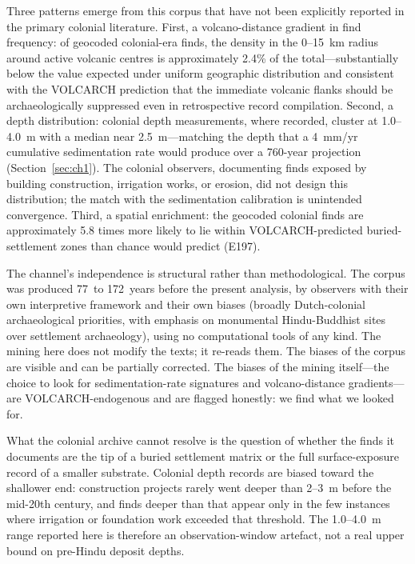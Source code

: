 \documentclass[12pt,a4paper]{article}
\begin{document}
Three patterns emerge from this corpus that have not been explicitly reported in the primary colonial literature. First, a volcano-distance gradient in find frequency: of geocoded colonial-era finds, the density in the 0--15~km radius around active volcanic centres is approximately 2.4\% of the total---substantially below the value expected under uniform geographic distribution and consistent with the VOLCARCH prediction that the immediate volcanic flanks should be archaeologically suppressed even in retrospective record compilation. Second, a depth distribution: colonial depth measurements, where recorded, cluster at 1.0--4.0~m with a median near 2.5~m---matching the depth that a 4~mm/yr cumulative sedimentation rate would produce over a 760-year projection (Section~\ref{sec:ch1}). The colonial observers, documenting finds exposed by building construction, irrigation works, or erosion, did not design this distribution; the match with the sedimentation calibration is unintended convergence. Third, a spatial enrichment: the geocoded colonial finds are approximately 5.8 times more likely to lie within VOLCARCH-predicted buried-settlement zones than chance would predict (E197).

The channel's independence is structural rather than methodological. The corpus was produced 77~to 172~years before the present analysis, by observers with their own interpretive framework and their own biases (broadly Dutch-colonial archaeological priorities, with emphasis on monumental Hindu-Buddhist sites over settlement archaeology), using no computational tools of any kind. The mining here does not modify the texts; it re-reads them. The biases of the corpus are visible and can be partially corrected. The biases of the mining itself---the choice to look for sedimentation-rate signatures and volcano-distance gradients---are VOLCARCH-endogenous and are flagged honestly: we find what we looked for.

What the colonial archive cannot resolve is the question of whether the finds it documents are the tip of a buried settlement matrix or the full surface-exposure record of a smaller substrate. Colonial depth records are biased toward the shallower end: construction projects rarely went deeper than 2--3~m before the mid-20th century, and finds deeper than that appear only in the few instances where irrigation or foundation work exceeded that threshold. The 1.0--4.0~m range reported here is therefore an observation-window artefact, not a real upper bound on pre-Hindu deposit depths.
\end{document}
